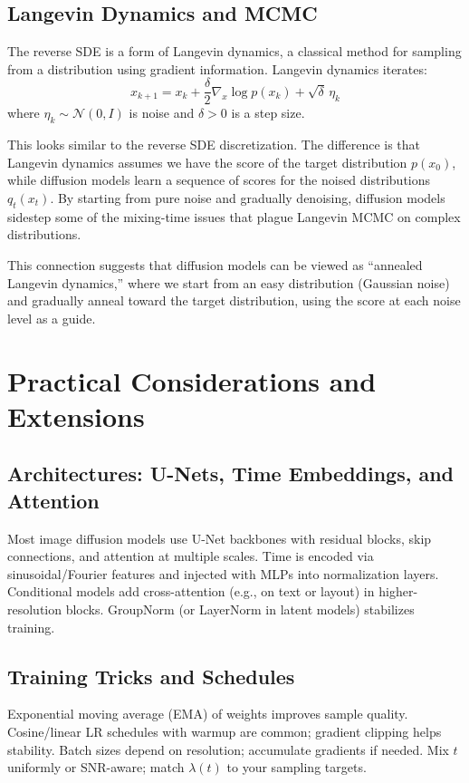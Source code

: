 \subsection{Langevin Dynamics and MCMC}

The reverse SDE is a form of Langevin dynamics, a classical method for sampling from a distribution using gradient information. Langevin dynamics iterates:
%
\begin{equation}
x_{k+1} = x_k + \frac{\delta}{2} \nabla_x \log p(x_k) + \sqrt{\delta} \, \eta_k
\end{equation}
%
where $\eta_k \sim \mathcal{N}(0,I)$ is noise and $\delta>0$ is a step size.

\vspPara

This looks similar to the reverse SDE discretization. The difference is that Langevin dynamics assumes we have the score of the target distribution $p(x_0)$, while diffusion models learn a sequence of scores for the noised distributions $q_t(x_t)$. By starting from pure noise and gradually denoising, diffusion models sidestep some of the mixing-time issues that plague Langevin MCMC on complex distributions.

\vspPara

This connection suggests that diffusion models can be viewed as ``annealed Langevin dynamics,'' where we start from an easy distribution (Gaussian noise) and gradually anneal toward the target distribution, using the score at each noise level as a guide.

\vspChapter

\section{Practical Considerations and Extensions}

\vspLarge
\subsection{Architectures: U-Nets, Time Embeddings, and Attention}
Most image diffusion models use U-Net backbones with residual blocks, skip connections, and attention at multiple scales. Time is encoded via sinusoidal/Fourier features and injected with MLPs into normalization layers. Conditional models add cross-attention (e.g., on text or layout) in higher-resolution blocks. GroupNorm (or LayerNorm in latent models) stabilizes training.

\vspMed
\subsection{Training Tricks and Schedules}
Exponential moving average (EMA) of weights improves sample quality. Cosine/linear LR schedules with warmup are common; gradient clipping helps stability. Batch sizes depend on resolution; accumulate gradients if needed. Mix $t$ uniformly or SNR-aware; match $\lambda(t)$ to your sampling targets.


